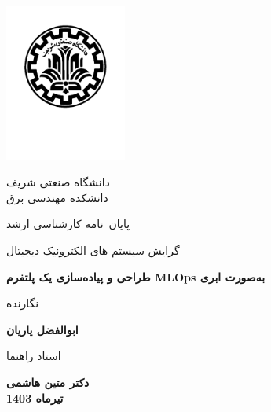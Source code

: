 

\thispagestyle{empty}
{\centering
	\mainjeldfont
	\vspace*{-2.5cm}
	\begin{latin}
		\centering
		\includegraphics[width=4cm]{Sharif_Logo.pdf}
	\end{latin}
	
	\vspace*{-2cm}
	
	{\Large دانشگاه صنعتی شریف \\ \vspace{0mm} \large دانشکده مهندسی برق}
	
	\vspace{1.4cm}
	
	{\large پایان~نامه کارشناسی ارشد\par} 
	{\large  گرایش سیستم های الکترونیک دیجیتال\par}  
	\vspace{1.3cm}
	{\Huge \textbf{طراحی و پیاده‌سازی یک پلتفرم MLOps به‌صورت ابری} }\par
	
	\vfil
	{\fieldnamefont نگارنده} \par
	{\Large\textbf{ابوالفضل یاریان}}
	
	\vfil
	{\fieldnamefont استاد راهنما} \par 
	{\Large\textbf{دکتر متین هاشمی}}\\
	
	
	
	\vfil
	{\textbf{تیرماه 1403}}
	
	
	
}